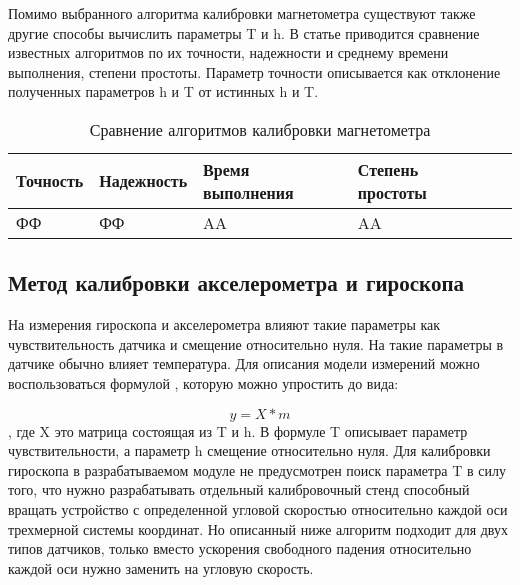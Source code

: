 Помимо выбранного алгоритма калибровки магнетометра существуют также другие способы вычислить параметры T и h. 
В статье %
приводится сравнение известных алгоритмов по их точности, надежности и среднему времени выполнения, степени простоты.
Параметр точности описывается как отклонение полученных параметров h и T от истинных h и T.

\begin{table}[ht]
    \caption{Сравнение алгоритмов калибровки магнетометра}
    \label{table:domain:magnet_calib_comp}
    \begin{tabular}{| >{\raggedright}m{}
                    | >{\raggedright\arraybackslash}m{}|
                    | >{\raggedright\arraybackslash}m{}|
                    | >{\raggedright\arraybackslash}m{}|
                    | >{\raggedright\arraybackslash}m{}|}
        \hline
        \centering Точность & 
        \centering\arraybackslash Надежность &
        \centering\arraybackslash Время выполнения &
        \centering\arraybackslash Степень простоты
        \\

        \hline
        ФФ & ФФ & AA & AA \\

        \hline
    \end{tabular}
\end{table}

\fixTableSectionSpace



\subsection{Метод калибровки акселерометра и гироскопа}

На измерения гироскопа и акселерометра влияют такие параметры как чувствительность датчика и смещение относительно нуля.
На такие параметры в датчике обычно влияет температура.
Для описания модели измерений можно воспользоваться формулой %
, которую можно упростить до вида:

$$ y = X*m $$
, где X это матрица состоящая из T и h.
В формуле T описывает параметр чувствительности, а параметр h смещение относительно нуля.
Для калибровки гироскопа в разрабатываемом модуле не предусмотрен поиск параметра T в силу того, 
что нужно разрабатывать отдельный калибровочный стенд способный вращать устройство с определенной 
угловой скоростью относительно каждой оси трехмерной системы координат. Но описанный ниже алгоритм подходит для двух типов датчиков, 
только вместо ускорения свободного падения относительно каждой оси нужно заменить на угловую скорость.

